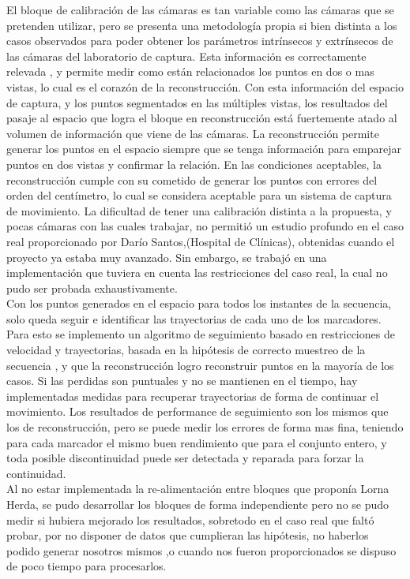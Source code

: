 El bloque de calibración de las cámaras es tan variable como las cámaras que se pretenden utilizar, pero se presenta una metodología propia si bien distinta a los casos observados para poder obtener los parámetros intrínsecos y extrínsecos de las cámaras del laboratorio de captura. Esta información es correctamente relevada , y permite medir como están relacionados los puntos en dos o mas vistas, lo cual es el corazón de la reconstrucción. Con esta información del espacio de captura, y los puntos segmentados en las múltiples vistas, los resultados del pasaje al espacio que logra el bloque en reconstrucción está  fuertemente atado al volumen de información que viene de las cámaras. La reconstrucción permite generar los puntos en el espacio siempre que se tenga información para emparejar puntos en dos vistas y confirmar  la relación. En las condiciones aceptables, la reconstrucción cumple con su cometido de generar los puntos con errores del orden del centímetro, lo cual se considera aceptable para un sistema de captura de movimiento. La dificultad de tener una calibración distinta a la propuesta, y pocas cámaras con las cuales trabajar, no permitió un estudio profundo en el caso real proporcionado por Darío Santos,(Hospital de Clínicas), obtenidas cuando el proyecto ya estaba muy avanzado. Sin embargo, se trabajó en una implementación que tuviera en cuenta las restricciones del caso real, la cual no pudo ser probada exhaustivamente.
\\ 

Con los puntos generados en el espacio para todos los instantes de la secuencia, solo queda seguir e identificar las trayectorias de cada uno de los marcadores. Para esto se implemento un algoritmo de seguimiento basado en restricciones de velocidad y trayectorias, basada en la hipótesis de correcto muestreo de la secuencia , y que la reconstrucción logro reconstruir puntos en la mayoría de los casos. Si las perdidas son puntuales y no se mantienen en el tiempo, hay implementadas medidas para recuperar trayectorias de forma de continuar el movimiento. Los resultados de performance de seguimiento son los mismos que los de reconstrucción, pero se puede medir los errores de forma mas fina, teniendo para cada marcador el mismo buen rendimiento que para el conjunto entero, y toda posible discontinuidad puede ser detectada y reparada para forzar la continuidad. 
\\ 

Al no estar implementada la re-alimentación entre bloques que proponía Lorna Herda, se pudo desarrollar los bloques de forma independiente pero no se pudo medir si hubiera mejorado los resultados, sobretodo en el caso real que faltó probar, por no disponer de datos que cumplieran las hipótesis, no haberlos podido generar nosotros mismos ,o cuando nos fueron proporcionados se dispuso de poco tiempo para procesarlos.
\\

